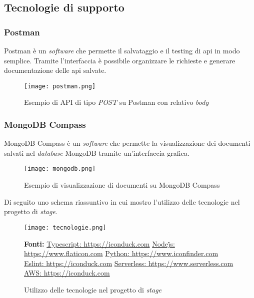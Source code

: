 \subsection{Tecnologie di supporto}
\subsubsection{Postman}
Postman è un \textit{software} che permette il salvataggio e il testing di \gls{api} in modo semplice. Tramite l'interfaccia è possibile organizzare le richieste e generare documentazione delle \gls{api} salvate.
\begin{figure}[H]
    \centering
    \texttt{[image: postman.png]}
    \caption{Esempio di API di tipo \textit{POST} su Postman con relativo \textit{body}}
    \label{fig:Postman}
\end{figure} 



\subsubsection{MongoDB Compass}
MongoDB Compass è un \textit{software} che permette la visualizzazione dei documenti salvati nel \textit{database} MongoDB tramite un'interfaccia grafica.
\begin{figure}[H]
    \centering
    \texttt{[image: mongodb.png]}
    \caption{Esempio di visualizzazione di documenti su MongoDB Compass}
    \label{fig:MongoDB}
\end{figure} 


\noindent
Di seguito uno schema riassuntivo in cui mostro l'utilizzo delle tecnologie nel progetto di \textit{stage}.
\begin{figure}[H]
    \centering
    \texttt{[image: tecnologie.png]}
    \caption{Utilizzo delle tecnologie nel progetto di \textit{stage}}
    \label{fig:tecnologie}
    \small \textbf{Fonti:} \href{https://iconduck.com/icons/95017/typescript-icon}{Typescript: https://iconduck.com} \href{https://www.flaticon.com/free-icon/nodejs_919825}{Node\.js: https://www.flaticon.com} \href{https://www.iconfinder.com/icons/4518857/python_icon} {Python: https://www.iconfinder.com} \href{https://iconduck.com/icons/94274/eslint} {Eslint: https://iconduck.com} \href{https://www.serverless.com/} {Serverless: https://www.serverless.com} \href{https://iconduck.com/icons/10826/amazon-aws} {AWS: https://iconduck.com}
\end{figure}

